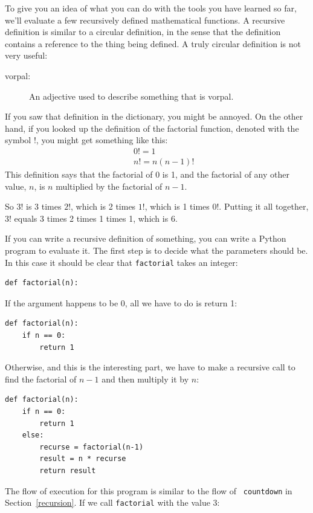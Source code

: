 \documentclass[10pt]{book}
\begin{document}
To give you an idea of what you can do with the tools you have learned
so far, we'll evaluate a few recursively defined mathematical
functions.  A recursive definition is similar to a circular
definition, in the sense that the definition contains a reference to
the thing being defined.  A truly circular definition is not very
useful:

\begin{description}

\item[vorpal:] An adjective used to describe something that is vorpal.

\end{description}

If you saw that definition in the dictionary, you might be annoyed. On
the other hand, if you looked up the definition of the factorial
function, denoted with the symbol $!$, you might get something like
this:
%
\begin{eqnarray*}
&&  0! = 1 \\
&&  n! = n (n-1)!
\end{eqnarray*}
%
This definition says that the factorial of 0 is 1, and the factorial
of any other value, $n$, is $n$ multiplied by the factorial of $n-1$.

So $3!$ is 3 times $2!$, which is 2 times $1!$, which is 1 times
$0!$. Putting it all together, $3!$ equals 3 times 2 times 1 times 1,
which is 6.

If you can write a recursive definition of something, you can
write a Python program to evaluate it. The first step is to decide
what the parameters should be.  In this case it should be clear
that {\tt factorial} takes an integer:

\begin{verbatim}
def factorial(n):
\end{verbatim}
%
If the argument happens to be 0, all we have to do is return 1:

\begin{verbatim}
def factorial(n):
    if n == 0:
        return 1
\end{verbatim}
%
Otherwise, and this is the interesting part, we have to make a
recursive call to find the factorial of $n-1$ and then multiply it by
$n$:

\begin{verbatim}
def factorial(n):
    if n == 0:
        return 1
    else:
        recurse = factorial(n-1)
        result = n * recurse
        return result
\end{verbatim}
%
The flow of execution for this program is similar to the flow of {\tt
countdown} in Section~\ref{recursion}.  If we call {\tt factorial}
with the value 3:
\end{document}
